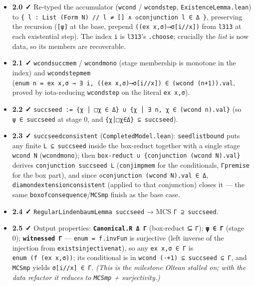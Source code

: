\documentclass[11pt,a4paper]{article}
\renewcommand{\_}{\origtextunderscore\allowbreak}
\begin{document}
\begin{itemize}
\item
  \textbf{2.0 ✓} Re-typed the accumulator (\texttt{wcond} / \texttt{wcond\_step}, \texttt{ExistenceLemma.lean}) to \texttt{\{\ l\ :\ List\ (Form\ N)\ //\ l\ ≠\ {[}{]}\ ∧\ ◇conjunction\textquotesingle{}\ l\ ∈\ Δ\ \}}, preserving the recursion (\texttt{{[}ψ{]}} at the base, prepend \texttt{((ex\ x,σ)⟶σ{[}i//x{]})} from \texttt{l313\textquotesingle{}} at each existential step). The index \texttt{i} is \texttt{l313\textquotesingle{}}'s \texttt{.choose}; crucially the \emph{list} is now data, so its members are recoverable.
\item
  \textbf{2.1 ✓} \texttt{wcond\_succ\_mem} / \texttt{wcond\_mono} (stage membership is monotone in the index) and \texttt{wcond\_step\_mem} (\texttt{enum\ n\ =\ ex\ x,σ\ →\ ∃\ i,\ ((ex\ x,σ)⟶σ{[}i//x{]})\ ∈\ (wcond\ (n+1)).val}, proved by iota-reducing \texttt{wcond\_step} on the literal \texttt{ex\ x,σ}).
\item
  \textbf{2.2 ✓} \texttt{succ\_seed\ :=\ \{χ\ │\ □χ\ ∈\ Δ\}\ ∪\ \{χ\ │\ ∃\ n,\ χ\ ∈\ (wcond\ n).val\}} (so \texttt{ψ\ ∈\ succ\_seed} at stage 0, and \texttt{\{χ│□χ∈Δ\}\ ⊆\ succ\_seed}).
\item
  \textbf{2.3 ✓} \texttt{succ\_seed\_consistent} (\texttt{CompletedModel.lean}): \texttt{seed\_list\_bound} puts any finite \texttt{L\ ⊆\ succ\_seed} inside the box-reduct together with a single stage \texttt{wcond\ N} (\texttt{wcond\_mono}); then \texttt{box-reduct\ ∪\ \{conjunction\textquotesingle{}\ (wcond\ N).val\}} derives \texttt{conjunction\ succ\_seed\ L} (\texttt{conj\textquotesingle{}\_imp\_mem} for the conditionals, \texttt{Γ\_premise} for the box part), and since \texttt{◇conjunction\textquotesingle{}\ (wcond\ N).val\ ∈\ Δ}, \texttt{diamond\_extension\_consistent} (applied to that conjunction) closes it --- the same \texttt{box\_of\_consequence}/\texttt{MCS\_mp} finish as the base case.
\item
  \textbf{2.4 ✓} \texttt{RegularLindenbaumLemma\ succ\_seed} → MCS \texttt{Γ\textquotesingle{}\ ⊇\ succ\_seed}.
\item
  \textbf{2.5 ✓} Output properties: \textbf{\texttt{Canonical.R\ Δ\ Γ\textquotesingle{}}} (box-reduct ⊆ \texttt{Γ\textquotesingle{}}); \textbf{\texttt{ψ\ ∈\ Γ\textquotesingle{}}} (stage 0); \textbf{\texttt{witnessed\ Γ\textquotesingle{}}} --- \texttt{enum\ =\ f.invFun} is surjective (left inverse of the injection from \texttt{exists\_injective\_nat}), so any \texttt{ex\ x,σ\ ∈\ Γ\textquotesingle{}} is \texttt{enum\ (f\ (ex\ x,σ))}; its conditional is in \texttt{wcond\ (·+1)\ ⊆\ succ\_seed\ ⊆\ Γ\textquotesingle{}}, and \texttt{MCS\_mp} yields \texttt{σ{[}i//x{]}\ ∈\ Γ\textquotesingle{}}. \emph{(This is the milestone Oltean stalled on; with the data refactor it reduces to \texttt{MCS\_mp} + surjectivity.)}

\end{itemize}
\end{document}
